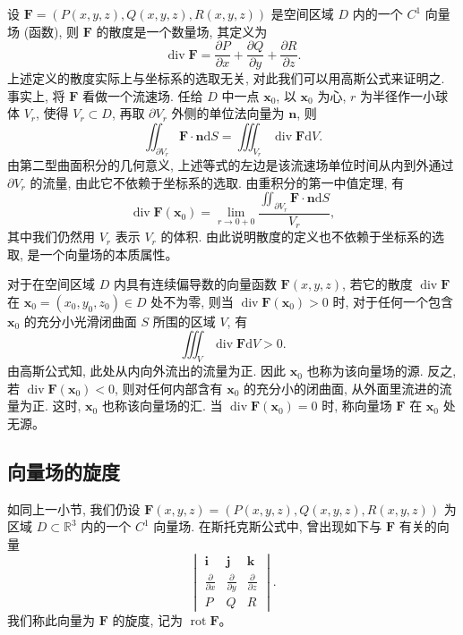 \documentclass[UTF8, 12pt, fontset=fandol, oneside]{ctexart}
\begin{document}
设 $\boldsymbol F=(P(x,y,z),Q(x,y,z),R(x,y,z))$ 是空间区域 $D$ 内的一个 $C^1$ 向量场 (函数), 则 $\boldsymbol F$ 的散度是一个数量场, 其定义为
\[
  \operatorname{div}\boldsymbol F=
  \frac{\partial P}{\partial x}+\frac{\partial Q}{\partial y}+\frac{\partial R}{\partial z}.
\]
上述定义的散度实际上与坐标系的选取无关, 对此我们可以用高斯公式来证明之. 事实上, 将 $\boldsymbol F$ 看做一个流速场. 任给 $D$ 中一点 $\boldsymbol x_0$, 以 $\boldsymbol x_0$ 为心, $r$ 为半径作一小球体 $V_r$, 使得 $V_r\subset D$, 再取 $\partial V_r$ 外侧的单位法向量为 $\boldsymbol n$, 则
\[
  \iint_{\partial V_r}\boldsymbol F\cdot\boldsymbol n\mathrm dS
  =
  \iiint_{V_r}\operatorname{div}\boldsymbol F\mathrm dV.
\]
由第二型曲面积分的几何意义, 上述等式的左边是该流速场单位时间从内到外通过 $\partial V_r$ 的流量, 由此它不依赖于坐标系的选取. 由重积分的第一中值定理, 有
\[
  \operatorname{div}\boldsymbol F(\boldsymbol x_0)
  =
  \lim_{r\to0+0}
  \frac{\iint_{\partial V_r}\boldsymbol F\cdot\boldsymbol n\mathrm dS}{V_r},
\]
其中我们仍然用 $V_r$ 表示 $V_r$ 的体积. 由此说明散度的定义也不依赖于坐标系的选取, 是一个向量场的本质属性。

对于在空间区域 $D$ 内具有连续偏导数的向量函数 $\boldsymbol F(x,y,z)$, 若它的散度 $\operatorname{div}\boldsymbol F$ 在 $\boldsymbol x_0=(x_0,y_0,z_0)\in D$ 处不为零, 则当 $\operatorname{div}\boldsymbol F(\boldsymbol x_0)>0$ 时, 对于任何一个包含 $\boldsymbol x_0$ 的充分小光滑闭曲面 $S$ 所围的区域 $V$, 有
\[
  \iiint_V\operatorname{div}\boldsymbol F\mathrm dV>0.
\]
由高斯公式知, 此处从内向外流出的流量为正. 因此 $\boldsymbol x_0$ 也称为该向量场的源. 反之, 若 $\operatorname{div}\boldsymbol F(\boldsymbol x_0)<0$, 则对任何内部含有 $\boldsymbol x_0$ 的充分小的闭曲面, 从外面里流进的流量为正. 这时, $\boldsymbol x_0$ 也称该向量场的汇. 当 $\operatorname{div}\boldsymbol F(\boldsymbol x_0)=0$ 时, 称向量场 $\boldsymbol F$ 在 $\boldsymbol x_0$ 处无源。

\subsection{向量场的旋度}

如同上一小节, 我们仍设 $\boldsymbol F(x,y,z)=(P(x,y,z),Q(x,y,z),R(x,y,z))$ 为区域 $D\subset\mathbb R^3$ 内的一个 $C^1$ 向量场. 在斯托克斯公式中, 曾出现如下与 $\boldsymbol F$ 有关的向量
\[
  \begin{vmatrix}
    \boldsymbol i&\boldsymbol j&\boldsymbol k\\
    \frac{\partial}{\partial x}&\frac{\partial}{\partial y}&\frac{\partial}{\partial z}\\
    P&Q&R
  \end{vmatrix}.
\]
我们称此向量为 $\boldsymbol F$ 的旋度, 记为 $\operatorname{rot}\boldsymbol F$。
\end{document}
